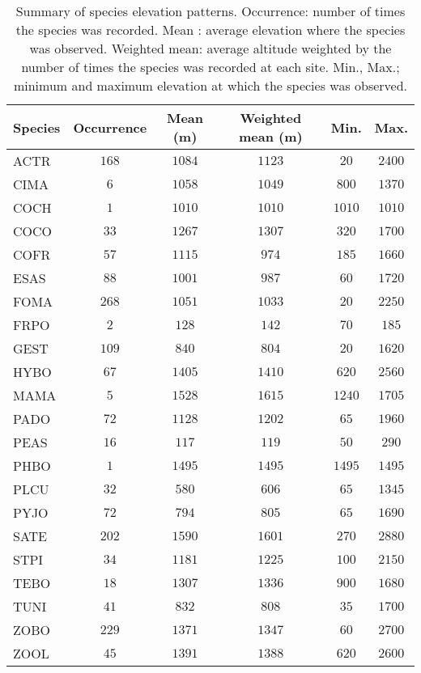 %
\begin{table}[!h]
\caption{Summary of species elevation patterns. Occurrence: number of times the species was recorded. Mean : average elevation where the species was observed. Weighted mean: average altitude weighted by the number of times the species was recorded at each site. Min., Max.; minimum and maximum elevation at which the species was observed.\label{era}} 
\begin{center}
\begin{tabular}{lccccc}
\hline
\multicolumn{1}{l}{\R Species}&\multicolumn{1}{c}{Occurrence}&\multicolumn{1}{c}{Mean (m)}&\multicolumn{1}{c}{Weighted mean (m)}&\multicolumn{1}{c}{Min.}&\multicolumn{1}{c}{Max.}\tabularnewline
\hline
\R ACTR&$168$&$1084$&$1123$&$  20$&$2400$\tabularnewline
CIMA&$  6$&$1058$&$1049$&$ 800$&$1370$\tabularnewline
COCH&$  1$&$1010$&$1010$&$1010$&$1010$\tabularnewline
COCO&$ 33$&$1267$&$1307$&$ 320$&$1700$\tabularnewline
COFR&$ 57$&$1115$&$ 974$&$ 185$&$1660$\tabularnewline
ESAS&$ 88$&$1001$&$ 987$&$  60$&$1720$\tabularnewline
FOMA&$268$&$1051$&$1033$&$  20$&$2250$\tabularnewline
FRPO&$  2$&$ 128$&$ 142$&$  70$&$ 185$\tabularnewline
GEST&$109$&$ 840$&$ 804$&$  20$&$1620$\tabularnewline
HYBO&$ 67$&$1405$&$1410$&$ 620$&$2560$\tabularnewline
MAMA&$  5$&$1528$&$1615$&$1240$&$1705$\tabularnewline
PADO&$ 72$&$1128$&$1202$&$  65$&$1960$\tabularnewline
PEAS&$ 16$&$ 117$&$ 119$&$  50$&$ 290$\tabularnewline
PHBO&$  1$&$1495$&$1495$&$1495$&$1495$\tabularnewline
PLCU&$ 32$&$ 580$&$ 606$&$  65$&$1345$\tabularnewline
PYJO&$ 72$&$ 794$&$ 805$&$  65$&$1690$\tabularnewline
SATE&$202$&$1590$&$1601$&$ 270$&$2880$\tabularnewline
STPI&$ 34$&$1181$&$1225$&$ 100$&$2150$\tabularnewline
TEBO&$ 18$&$1307$&$1336$&$ 900$&$1680$\tabularnewline
TUNI&$ 41$&$ 832$&$ 808$&$  35$&$1700$\tabularnewline
ZOBO&$229$&$1371$&$1347$&$  60$&$2700$\tabularnewline
ZOOL&$ 45$&$1391$&$1388$&$ 620$&$2600$\tabularnewline
\hline
\end{tabular}
\end{center}
\end{table}

